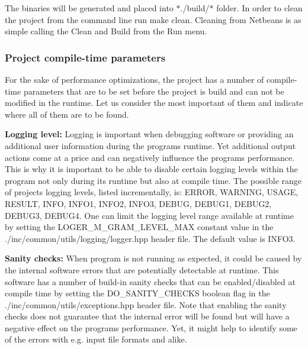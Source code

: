 The binaries will be generated and placed into $\ast$./build/$\ast$ folder. In order to clean the project from the command line run {\ttfamily make clean}. Cleaning from Netbeans is as simple calling the {\ttfamily Clean and Build} from the {\ttfamily Run} menu.

\subsubsection*{Project compile-\/time parameters}

For the sake of performance optimizations, the project has a number of compile-\/time parameters that are to be set before the project is build and can not be modified in the runtime. Let us consider the most important of them and indicate where all of them are to be found.

{\bfseries Logging level\+:} Logging is important when debugging software or providing an additional user information during the program\textquotesingle{}s runtime. Yet additional output actions come at a price and can negatively influence the program\textquotesingle{}s performance. This is why it is important to be able to disable certain logging levels within the program not only during its runtime but also at compile time. The possible range of project\textquotesingle{}s logging levels, listed incrementally, is\+: E\+R\+R\+O\+R, W\+A\+R\+N\+I\+N\+G, U\+S\+A\+G\+E, R\+E\+S\+U\+L\+T, I\+N\+F\+O, I\+N\+F\+O1, I\+N\+F\+O2, I\+N\+F\+O3, D\+E\+B\+U\+G, D\+E\+B\+U\+G1, D\+E\+B\+U\+G2, D\+E\+B\+U\+G3, D\+E\+B\+U\+G4. One can limit the logging level range available at runtime by setting the {\ttfamily L\+O\+G\+E\+R\+\_\+\+M\+\_\+\+G\+R\+A\+M\+\_\+\+L\+E\+V\+E\+L\+\_\+\+M\+A\+X} constant value in the {\ttfamily ./inc/common/utils/logging/logger.hpp} header file. The default value is I\+N\+F\+O3.

{\bfseries Sanity checks\+:} When program is not running as expected, it could be caused by the internal software errors that are potentially detectable at runtime. This software has a number of build-\/in sanity checks that can be enabled/disabled at compile time by setting the {\ttfamily D\+O\+\_\+\+S\+A\+N\+I\+T\+Y\+\_\+\+C\+H\+E\+C\+K\+S} boolean flag in the {\ttfamily ./inc/common/utils/exceptions.hpp} header file. Note that enabling the sanity checks does not guarantee that the internal error will be found but will have a negative effect on the program\textquotesingle{}s performance. Yet, it might help to identify some of the errors with e.\+g. input file formats and alike.

